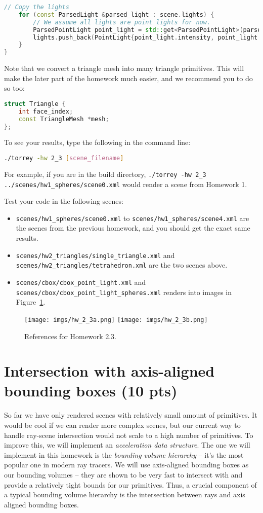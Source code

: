 \begin{lstlisting}[language=C++]
    // Copy the lights
    for (const ParsedLight &parsed_light : scene.lights) {
        // We assume all lights are point lights for now.
        ParsedPointLight point_light = std::get<ParsedPointLight>(parsed_light);
        lights.push_back(PointLight{point_light.intensity, point_light.position});
    }
}
\end{lstlisting}
Note that we convert a triangle mesh into many triangle primitives. This will make the later part of the homework much easier, and we recommend you to do so too:
\begin{lstlisting}[language=C++]
struct Triangle {
    int face_index;
    const TriangleMesh *mesh;
};
\end{lstlisting}

To see your results, type the following in the command line:
\begin{lstlisting}[language=bash]
./torrey -hw 2_3 [scene_filename]
\end{lstlisting}
For example, if you are in the build directory, \lstinline{./torrey -hw 2_3 ../scenes/hw1_spheres/scene0.xml} would render a scene from Homework 1.

Test your code in the following scenes: 
\begin{itemize}
  \item \lstinline{scenes/hw1_spheres/scene0.xml} to \lstinline{scenes/hw1_spheres/scene4.xml} are the scenes from the previous homework, and you should get the exact same results. 
  \item \lstinline{scenes/hw2_triangles/single_triangle.xml} and \lstinline{scenes/hw2_triangles/tetrahedron.xml} are the two scenes above.
  \item \lstinline{scenes/cbox/cbox_point_light.xml} and \lstinline{scenes/cbox/cbox_point_light_spheres.xml} renders into images in Figure~\ref{fig:hw_2_3}.
\end{itemize}

\begin{figure}[ht]
    \centering
    \texttt{[image: imgs/hw\_2\_3a.png]}
    \texttt{[image: imgs/hw\_2\_3b.png]}
    \caption{References for Homework 2.3.}
    \label{fig:hw_2_3}
\end{figure}

\section{Intersection with axis-aligned bounding boxes (10 pts)}
So far we have only rendered scenes with relatively small amount of primitives. It would be cool if we can render more complex scenes, but our current way to handle ray-scene intersection would not scale to a high number of primitives. To improve this, we will implement an \emph{acceleration data structure}. The one we will implement in this homework is the \emph{bounding volume hierarchy} -- it's the most popular one in  modern ray tracers. We will use axis-aligned bounding boxes as our bounding volumes -- they are shown to be very fast to intersect with and provide a relatively tight bounds for our primitives. Thus, a crucial component of a typical bounding volume hierarchy is the intersection between rays and axis aligned bounding boxes. 

